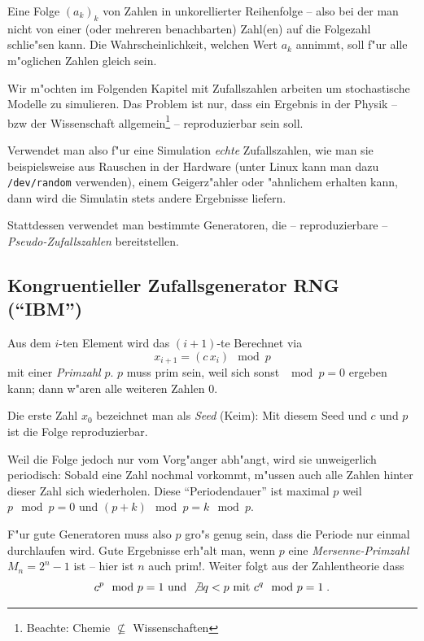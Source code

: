 \documentclass[a4paper]{book}
\begin{document}
\begin{Def}
  [Zufallszahlen]
Eine Folge $(a_k)_k$ von Zahlen in unkorellierter Reihenfolge -- also bei der
man nicht von einer (oder mehreren benachbarten) Zahl(en) auf die
Folgezahl schlie"sen kann. Die Wahrscheinlichkeit, welchen Wert $a_k$
annimmt, soll f"ur alle m"oglichen Zahlen gleich sein.
\end{Def}

Wir m"ochten im Folgenden Kapitel mit Zufallszahlen arbeiten um
stochastische Modelle zu simulieren. Das Problem ist nur, dass ein
Ergebnis in der Physik -- bzw der Wissenschaft
allgemein\footnote{Beachte: Chemie $\not \subseteq$ Wissenschaften} --
reproduzierbar sein soll.

Verwendet man also f"ur eine Simulation \emph{echte} Zufallszahlen,
wie man sie beispielsweise aus Rauschen in der Hardware (unter Linux kann
man dazu \texttt{/dev/random} verwenden), einem
Geigerz"ahler oder "ahnlichem erhalten kann, dann wird die Simulatin
stets andere Ergebnisse liefern.

Stattdessen verwendet man bestimmte Generatoren, die --
reproduzierbare -- \emph{Pseudo-Zufallszahlen} bereitstellen.



\subsection{Kongruentieller Zufallsgenerator RNG ("`IBM"')}
\label{sec:kongr_zufallsg_rng_ibm}

Aus dem $i$-ten Element wird das $(i+1)$-te Berechnet via
\begin{equation}
  \label{eq:89}
  x_{i+1} = (c \, x_i ) \mod p
\end{equation}
mit einer \emph{Primzahl} $p$. $p$ muss prim sein, weil sich sonst
$\mod p = 0$ ergeben kann; dann w"aren alle weiteren Zahlen $0$.

Die erste Zahl $x_0$ bezeichnet man als \emph{Seed} (Keim): Mit diesem
Seed und $c$ und $p$ ist die Folge reproduzierbar.

Weil die Folge jedoch nur vom Vorg"anger abh"angt, wird sie
unweigerlich periodisch: Sobald eine Zahl nochmal vorkommt, m"ussen
auch alle Zahlen hinter dieser Zahl sich wiederholen. Diese
"`Periodendauer"' ist maximal $p$ weil $p\mod p = 0$ und $(p+k)\mod p
= k \mod p$.

F"ur gute Generatoren muss also $p$ gro"s genug sein, dass die Periode
nur einmal durchlaufen wird. Gute Ergebnisse erh"alt man, wenn $p$
eine \emph{Mersenne-Primzahl} $M_n = 2^n-1$ ist -- hier ist $n$ auch
prim!. Weiter folgt aus der Zahlentheorie dass
\begin{equation*}
  c^p \mod p = 1 \text{ und } \not \exists q < p \text{ mit } c^q \mod
  p = 1 \;.
\end{equation*}
\end{document}
